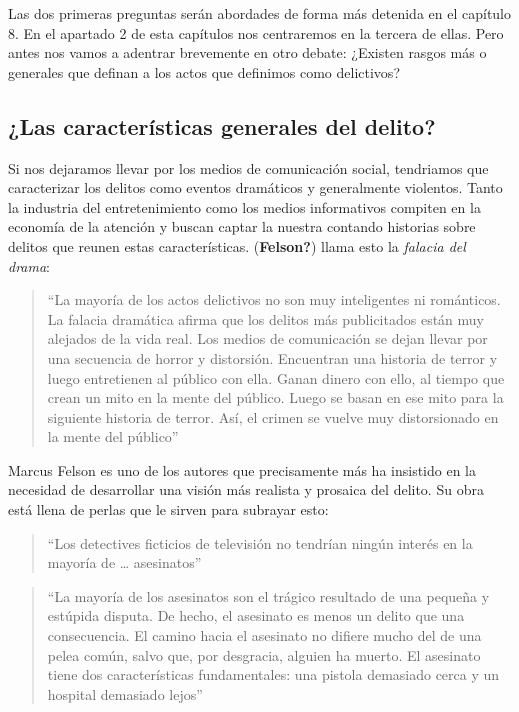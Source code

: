 \documentclass[
  spanish,
  letterpaper,
  DIV=11,
  numbers=noendperiod]{scrreprt}
\begin{document}
Las dos primeras preguntas serán abordades de forma más detenida en el
capítulo 8. En el apartado 2 de esta capítulos nos centraremos en la
tercera de ellas. Pero antes nos vamos a adentrar brevemente en otro
debate: ¿Existen rasgos más o generales que definan a los actos que
definimos como delictivos?

\subsection{¿Las características generales del
delito?}\label{las-caracteruxedsticas-generales-del-delito}

Si nos dejaramos llevar por los medios de comunicación social,
tendriamos que caracterizar los delitos como eventos dramáticos y
generalmente violentos. Tanto la industria del entretenimiento como los
medios informativos compiten en la economía de la atención y buscan
captar la nuestra contando historias sobre delitos que reunen estas
características. (\textbf{Felson?}) llama esto la \emph{falacia del
drama}:

\begin{quote}
``La mayoría de los actos delictivos no son muy inteligentes ni
románticos. La falacia dramática afirma que los delitos más publicitados
están muy alejados de la vida real. Los medios de comunicación se dejan
llevar por una secuencia de horror y distorsión. Encuentran una historia
de terror y luego entretienen al público con ella. Ganan dinero con
ello, al tiempo que crean un mito en la mente del público. Luego se
basan en ese mito para la siguiente historia de terror. Así, el crimen
se vuelve muy distorsionado en la mente del público''
\end{quote}

Marcus Felson es uno de los autores que precisamente más ha insistido en
la necesidad de desarrollar una visión más realista y prosaica del
delito. Su obra está llena de perlas que le sirven para subrayar esto:

\begin{quote}
``Los detectives ficticios de televisión no tendrían ningún interés en
la mayoría de \ldots{} asesinatos''
\end{quote}

\begin{quote}
``La mayoría de los asesinatos son el trágico resultado de una pequeña y
estúpida disputa. De hecho, el asesinato es menos un delito que una
consecuencia. El camino hacia el asesinato no difiere mucho del de una
pelea común, salvo que, por desgracia, alguien ha muerto. El asesinato
tiene dos características fundamentales: una pistola demasiado cerca y
un hospital demasiado lejos''
\end{quote}
\end{document}
